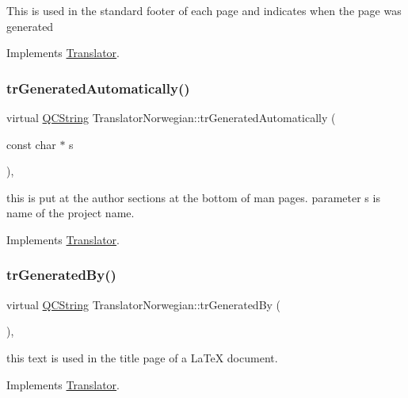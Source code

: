 This is used in the standard footer of each page and indicates when the page was generated 

Implements \mbox{\hyperlink{class_translator}{Translator}}.

\mbox{\label{class_translator_norwegian_a6f6c402589db72a54a47c9e9e336a055}} 
\subsubsection{\texorpdfstring{trGeneratedAutomatically()}{trGeneratedAutomatically()}}
{\footnotesize\ttfamily virtual \mbox{\hyperlink{class_q_c_string}{Q\+C\+String}} Translator\+Norwegian\+::tr\+Generated\+Automatically (\begin{DoxyParamCaption}\item[{const char $\ast$}]{s }\end{DoxyParamCaption})\hspace{0.3cm}{\ttfamily [inline]}, {\ttfamily [virtual]}}

this is put at the author sections at the bottom of man pages. parameter s is name of the project name. 

Implements \mbox{\hyperlink{class_translator}{Translator}}.

\mbox{\label{class_translator_norwegian_a1f1ff1719d5b3892d666abadeed6ee74}} 
\subsubsection{\texorpdfstring{trGeneratedBy()}{trGeneratedBy()}}
{\footnotesize\ttfamily virtual \mbox{\hyperlink{class_q_c_string}{Q\+C\+String}} Translator\+Norwegian\+::tr\+Generated\+By (\begin{DoxyParamCaption}{ }\end{DoxyParamCaption})\hspace{0.3cm}{\ttfamily [inline]}, {\ttfamily [virtual]}}

this text is used in the title page of a La\+TeX document. 

Implements \mbox{\hyperlink{class_translator}{Translator}}.

